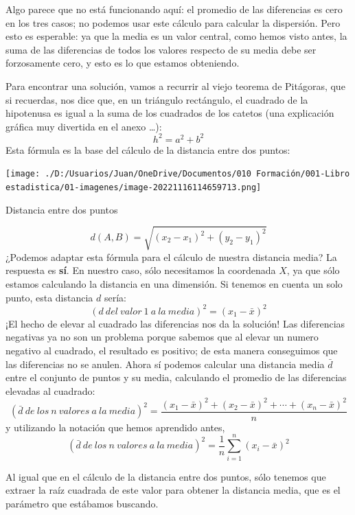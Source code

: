 \documentclass[
  letterpaper,
]{scrbook}
\begin{document}
Algo parece que no está funcionando aquí: el promedio de las diferencias
es cero en los tres casos; no podemos usar este cálculo para calcular la
dispersión. Pero esto es esperable: ya que la media es un valor central,
como hemos visto antes, la suma de las diferencias de todos los valores
respecto de su media debe ser forzosamente cero, y esto es lo que
estamos obteniendo.

Para encontrar una solución, vamos a recurrir al viejo teorema de
Pitágoras, que si recuerdas, nos dice que, en un triángulo rectángulo,
el cuadrado de la hipotenusa es igual a la suma de los cuadrados de los
catetos (una explicación gráfica muy divertida en el anexo \ldots): \[
h^2= a^2+b^2
\] Esta fórmula es la base del cálculo de la distancia entre dos puntos:

\begin{marginfigure}

{\centering \texttt{[image: ./D:/Usuarios/Juan/OneDrive/Documentos/010 Formación/001-Libro estadistica/01-imagenes/image-20221116114659713.png]}

}

\caption{Distancia entre dos puntos}

\end{marginfigure}

\[
d(A,B)=\sqrt{(x_2-x_1)^2+(y_2-y_1)^2}
\] ¿Podemos adaptar esta fórmula para el cálculo de nuestra distancia
media? La respuesta es \textbf{sí}. En nuestro caso, sólo necesitamos la
coordenada \(X\), ya que sólo estamos calculando la distancia en una
dimensión. Si tenemos en cuenta un solo punto, esta distancia \(d\)
sería: \[
(d{\ }del{\ }valor{\ }1{\ }a{\ }la{\ }media)^2=(x_1-\bar{x})^2
\] ¡El hecho de elevar al cuadrado las diferencias nos da la solución!
Las diferencias negativas ya no son un problema porque sabemos que al
elevar un numero negativo al cuadrado, el resultado es positivo; de esta
manera conseguimos que las diferencias no se anulen. Ahora sí podemos
calcular una distancia media \(\bar{d}\) entre el conjunto de puntos y
su media, calculando el promedio de las diferencias elevadas al
cuadrado: \[
(\bar{d}{\ }de{\ }los{\ }n{\ }valores{\ }a{\ }la{\ }media)^2=\frac{(x_1-\bar{x})^2 + (x_2-\bar{x})^2+\cdots+(x_n-\bar{x})^2}{n}
\] y utilizando la notación que hemos aprendido antes, \[
(\bar{d}{\ }de{\ }los{\ }n{\ }valores{\ }a{\ }la{\ }media)^2={\frac {1}{n}}\sum _{i=1}^{n}(x_{i}-\bar{x})^2
\]

Al igual que en el cálculo de la distancia entre dos puntos, sólo
tenemos que extraer la raíz cuadrada de este valor para obtener la
distancia media, que es el parámetro que estábamos buscando.
\end{document}
